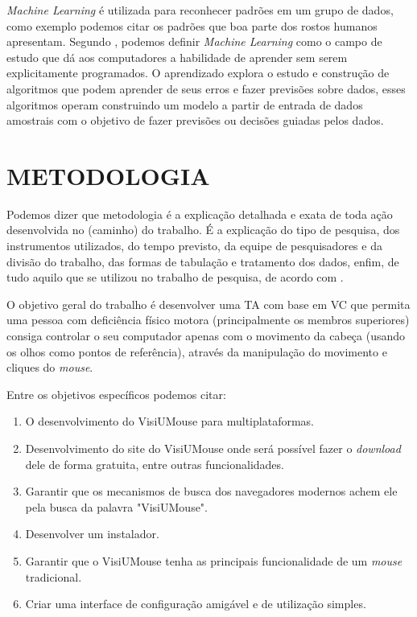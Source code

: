 \textit{Machine Learning} é utilizada para reconhecer padrões em um grupo de dados, como exemplo podemos citar os padrões que boa parte dos rostos humanos apresentam. Segundo , podemos definir \textit{Machine Learning} como o campo de estudo que dá aos computadores a habilidade de aprender sem serem explicitamente programados. O aprendizado explora o estudo e construção de algoritmos que podem aprender de seus erros e fazer previsões sobre dados, esses algoritmos operam construindo um modelo a partir de entrada de dados amostrais com o objetivo de fazer previsões ou decisões guiadas pelos dados.

\chapter{METODOLOGIA}\label{CAP3}

Podemos dizer que metodologia é a explicação detalhada e exata de toda ação desenvolvida no (caminho) do trabalho. É a explicação do tipo de pesquisa, dos instrumentos utilizados, do tempo previsto, da equipe de pesquisadores e da divisão do trabalho, das formas de tabulação e tratamento dos dados, enfim, de tudo aquilo que se utilizou no trabalho de pesquisa, de acordo com .

O objetivo geral do trabalho é desenvolver uma TA com base em VC que permita uma pessoa com deficiência físico motora (principalmente os membros superiores) consiga controlar o seu computador apenas com o movimento da cabeça (usando os olhos como pontos de referência), através da manipulação do movimento e cliques do \textit{mouse}.


Entre os objetivos específicos podemos citar: 
\begin{enumerate}
\item O desenvolvimento do VisiUMouse para multiplataformas.
\item Desenvolvimento do site do VisiUMouse onde será possível fazer o \textit{download} dele de forma gratuita, entre outras funcionalidades.
\item Garantir que os mecanismos de busca dos navegadores modernos achem ele pela busca da palavra "VisiUMouse".
\item Desenvolver um instalador.
\item Garantir que o VisiUMouse tenha as principais funcionalidade de um \textit{mouse} tradicional.
\item Criar uma interface de configuração amigável e de utilização simples.
\end{enumerate}

